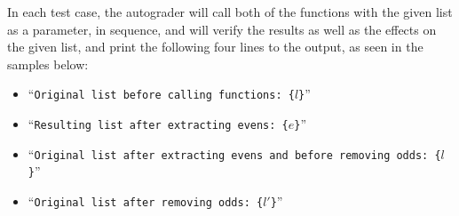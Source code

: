 In each test case, the autograder will call both of the functions
with the given list as a parameter, in sequence,
and will verify the results as well as the effects on the given list,
and print the following four lines to the output,
as seen in the samples below:
\begin{itemize}
    \item
    ``\texttt{Original list before calling functions: \{$l$\}}''

    \item
    ``\texttt{Resulting list after extracting evens: \{$e$\}}''

    \item
    ``\texttt{Original list after extracting evens and before removing odds: \{$l$\}}''

    \item
    ``\texttt{Original list after removing odds: \{$l'$\}}''
\end{itemize}
